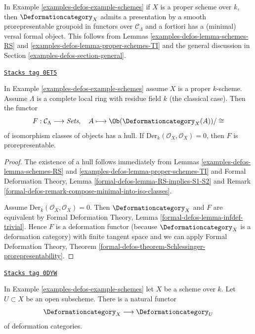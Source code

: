 In Example \ref{examples-defos-example-schemes} if $X$ is a proper scheme over $k$,
then $\Deformationcategory_X$
admits a presentation by a smooth prorepresentable groupoid in functors
over $\mathcal{C}_\Lambda$
and a fortiori has a (minimal) versal formal object. This follows
from Lemmas \ref{examples-defos-lemma-schemes-RS} and
\ref{examples-defos-lemma-proper-schemes-TI}
and the general discussion in Section \ref{examples-defos-section-general}.

\begin{lemma}
\label{examples-defos-lemma-schemes-hull}
\href{https://stacks.math.columbia.edu/tag/0ET5}{\texttt{Stacks tag 0ET5}}

In Example \ref{examples-defos-example-schemes} assume $X$ is a proper $k$-scheme.
Assume $\Lambda$ is a complete local ring with residue field $k$
(the classical case). Then the functor
$$
F : \mathcal{C}_\Lambda \longrightarrow \textit{Sets},\quad
A \longmapsto \Ob(\Deformationcategory_X(A))/\cong
$$
of isomorphism classes of objects has a hull. If
$\text{Der}_k(\mathcal{O}_X, \mathcal{O}_X) = 0$, then
$F$ is prorepresentable.
\end{lemma}

\begin{proof}
The existence of a hull follows immediately from
Lemmas \ref{examples-defos-lemma-schemes-RS} and \ref{examples-defos-lemma-proper-schemes-TI} and
Formal Deformation Theory, Lemma \ref{formal-defos-lemma-RS-implies-S1-S2}
and Remark \ref{formal-defos-remark-compose-minimal-into-iso-classes}.

\medskip\noindent
Assume $\text{Der}_k(\mathcal{O}_X, \mathcal{O}_X) = 0$. Then
$\Deformationcategory_X$ and $F$ are equivalent by
Formal Deformation Theory, Lemma \ref{formal-defos-lemma-infdef-trivial}.
Hence $F$ is a deformation functor (because $\Deformationcategory_X$ is a
deformation category) with finite tangent space and we can apply
Formal Deformation Theory, Theorem
\ref{formal-defos-theorem-Schlessinger-prorepresentability}.
\end{proof}

\begin{lemma}[Open]
\label{examples-defos-lemma-open}
\href{https://stacks.math.columbia.edu/tag/0DYW}{\texttt{Stacks tag 0DYW}}

In Example \ref{examples-defos-example-schemes} let $X$ be a scheme over $k$.
Let $U \subset X$ be an open subscheme.
There is a natural functor
$$
\Deformationcategory_X \longrightarrow \Deformationcategory_U
$$
of deformation categories.
\end{lemma}

